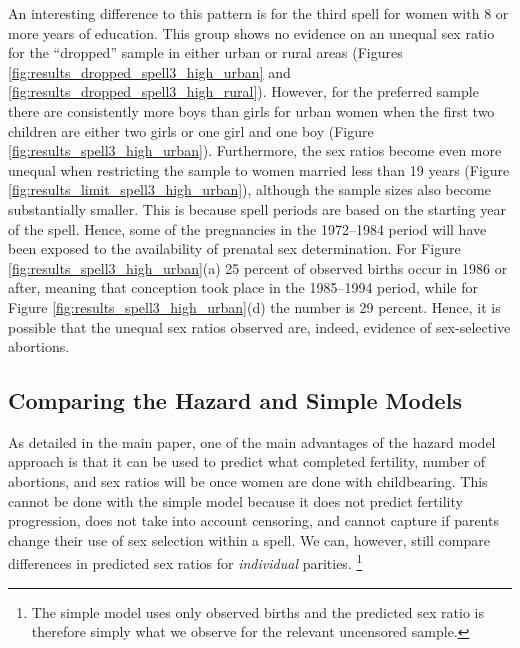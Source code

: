 \documentclass[12pt,letterpaper]{article}
\begin{document}
An interesting difference to this pattern is for the third spell for women with 8 or more
years of education.
This group shows no evidence on an unequal sex ratio for the ``dropped'' sample in 
either urban or rural areas (Figures \ref{fig:results_dropped_spell3_high_urban} and
\ref{fig:results_dropped_spell3_high_rural}).
However, for the preferred sample there are consistently more boys than girls for urban
women when the first two children are either two girls or one girl and one boy (Figure 
\ref{fig:results_spell3_high_urban}).
Furthermore, the sex ratios become even more unequal when restricting the sample to
women married less than 19 years (Figure \ref{fig:results_limit_spell3_high_urban}), 
although the sample sizes also become substantially smaller.
This is because spell periods are based on the starting year of the spell.
Hence, some of the pregnancies in the 1972--1984 period will have been exposed to the  
availability of prenatal sex determination.
For Figure \ref{fig:results_spell3_high_urban}(a) 25 percent of observed births 
occur in  1986 or after, meaning that conception took place in the 1985--1994 period, 
while for Figure \ref{fig:results_spell3_high_urban}(d) the number is 29 percent.
Hence, it is possible that the unequal sex ratios observed are, indeed, evidence of 
sex-selective abortions.

\clearpage
\newpage

\subsection{Comparing the Hazard and Simple Models}

As detailed in the main paper, one of the main advantages of the hazard model 
approach is that it can be used to predict what completed fertility, number of abortions, 
and sex ratios will be once women are done with childbearing.
This cannot be done with the simple model because it does not predict fertility
progression, does not take into account censoring, and cannot capture if parents
change their use of sex selection within a spell.
We can, however, still compare differences in predicted sex ratios for 
\emph{individual} parities.%
\footnote{
The simple model uses only observed births and the predicted sex ratio is 
therefore simply what we observe for the relevant uncensored sample.
}
\end{document}
